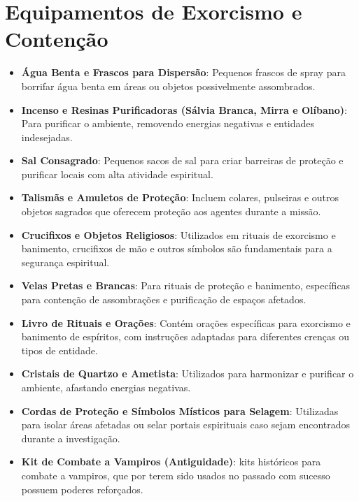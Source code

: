 \section{Equipamentos de Exorcismo e Contenção}

\begin{itemize}
    \item \textbf{Água Benta e Frascos para Dispersão}: Pequenos frascos de spray para borrifar água benta em áreas ou objetos possivelmente assombrados.

    \item \textbf{Incenso e Resinas Purificadoras (Sálvia Branca, Mirra e Olíbano)}: Para purificar o ambiente, removendo energias negativas e entidades indesejadas.

    \item \textbf{Sal Consagrado}: Pequenos sacos de sal para criar barreiras de proteção e purificar locais com alta atividade espiritual.

    \item \textbf{Talismãs e Amuletos de Proteção}: Incluem colares, pulseiras e outros objetos sagrados que oferecem proteção aos agentes durante a missão.

    \item \textbf{Crucifixos e Objetos Religiosos}: Utilizados em rituais de exorcismo e banimento, crucifixos de mão e outros símbolos são fundamentais para a segurança espiritual.

    \item \textbf{Velas Pretas e Brancas}: Para rituais de proteção e banimento, específicas para contenção de assombrações e purificação de espaços afetados.

    \item \textbf{Livro de Rituais e Orações}: Contém orações específicas para exorcismo e banimento de espíritos, com instruções adaptadas para diferentes crenças ou tipos de entidade.

    \item \textbf{Cristais de Quartzo e Ametista}: Utilizados para harmonizar e purificar o ambiente, afastando energias negativas.

    \item \textbf{Cordas de Proteção e Símbolos Místicos para Selagem}: Utilizadas para isolar áreas afetadas ou selar portais espirituais caso sejam encontrados durante a investigação.

    \item \textbf{Kit de Combate a Vampiros (Antiguidade)}: kits históricos para combate a vampiros, que por terem sido usados no passado com sucesso possuem poderes reforçados.
\end{itemize}

